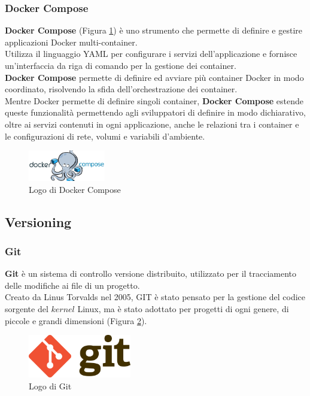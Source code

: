 \subsubsection{Docker Compose}
\textbf{Docker Compose} (Figura \ref{fig:docker_compose}) è uno strumento che permette di definire e gestire applicazioni \gls{Docker}{} multi-container. \\
Utilizza il linguaggio YAML per configurare i servizi dell'applicazione e fornisce un'interfaccia da riga di comando per la gestione dei \gls{container}{}.\\
\textbf{Docker Compose} permette di definire ed avviare più \gls{container}{} \gls{Docker}{} in modo coordinato, risolvendo 
la sfida dell'orchestrazione dei \gls{container}{}.\\
Mentre \gls{Docker}{} permette di definire singoli \gls{container}{}, \textbf{Docker Compose} estende queste funzionalità permettendo agli sviluppatori 
di definire in modo dichiarativo, oltre ai servizi contenuti in ogni applicazione, anche le relazioni tra i \gls{container}{} e le configurazioni di rete, volumi e variabili d'ambiente.\\
\begin{figure}[h]
    \centering
    \includegraphics[width=0.3\textwidth]{images/tecnologie/logo_docker_compose.png}
    \caption{Logo di Docker Compose}
    \label{fig:docker_compose}
\end{figure}

\subsection{Versioning}
\subsubsection{Git}
\textbf{Git} è un sistema di controllo versione distribuito, utilizzato per il tracciamento delle modifiche ai file di un progetto.\\ 
Creato da Linus Torvalds nel 2005, GIT è stato pensato per la gestione del codice sorgente del $kernel$ Linux, ma è stato adottato 
per progetti di ogni genere, di piccole e grandi dimensioni (Figura \ref{fig:git}).\\
\begin{figure}[h]
    \centering
    \includegraphics[width=0.4\textwidth]{images/tecnologie/logo_git.png}
    \caption{Logo di Git}
    \label{fig:git}
\end{figure}


